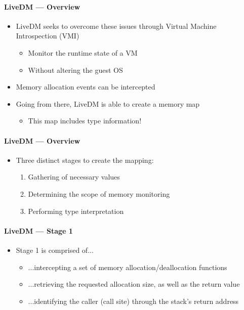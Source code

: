 \documentclass{i20lecture}
\begin{document}
\begin{frame}{\insertsection}
  \framesubtitle{LiveDM --- Overview}

  \begin{itemize}
	\item LiveDM seeks to overcome these issues through Virtual Machine Introspection (VMI)
	\pause
	\begin{itemize}
		\item Monitor the runtime state of a VM
		\pause
		\item Without altering the guest OS
	\end{itemize}
\pause
    \item Memory allocation events can be intercepted
\pause
    \item Going from there, LiveDM is able to create a memory map
	\begin{itemize}
		\pause
		\item This map includes type information!
	\end{itemize}
  \end{itemize}
\end{frame}

\begin{frame}{\insertsection}
  \framesubtitle{LiveDM --- Overview}

  \begin{itemize}
    \item Three distinct stages to create the mapping:
    \begin{enumerate}
\pause
     \item Gathering of necessary values
\pause
     \item Determining the scope of memory monitoring
\pause
     \item Performing type interpretation
    \end{enumerate}
  \end{itemize}
\end{frame}

\begin{frame}{\insertsection}
  \framesubtitle{LiveDM --- Stage 1}

  \begin{itemize}
    \item Stage 1 is comprised of...
    \begin{itemize}
     \item ...intercepting a set of memory allocation/deallocation functions
\pause
     \item ...retrieving the requested allocation size, as well as the return value
\pause
	 \item ...identifying the caller (call site) through the stack's return address
    \end{itemize}
  \end{itemize}
\end{frame}
\end{document}
